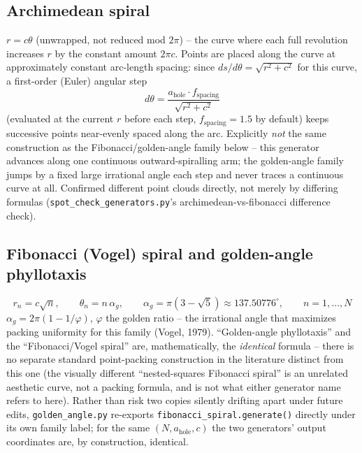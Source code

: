 \subsection{Archimedean spiral}
$r=c\theta$ (unwrapped, not reduced mod $2\pi$) -- the curve where each full
revolution increases $r$ by the constant amount $2\pi c$. Points are placed along the
curve at approximately constant arc-length spacing: since $ds/d\theta=\sqrt{r^2+c^2}$
for this curve, a first-order (Euler) angular step
\begin{equation}
d\theta = \frac{a_{\mathrm{hole}}\cdot f_{\mathrm{spacing}}}{\sqrt{r^2+c^2}}
\end{equation}
(evaluated at the current $r$ before each step, $f_{\mathrm{spacing}}=1.5$ by default)
keeps successive points near-evenly spaced along the arc. Explicitly \emph{not} the
same construction as the Fibonacci/golden-angle family below -- this generator advances
along one continuous outward-spiralling arm; the golden-angle family jumps by a fixed
large irrational angle each step and never traces a continuous curve at all. Confirmed
different point clouds directly, not merely by differing formulas
(\texttt{spot\_check\_generators.py}'s archimedean-vs-fibonacci difference check).

\subsection{Fibonacci (Vogel) spiral and golden-angle phyllotaxis}
\begin{equation}
r_n = c\sqrt n, \qquad \theta_n = n\,\alpha_g, \qquad \alpha_g = \pi(3-\sqrt5)\approx137.50776^\circ,
\qquad n=1,\dots,N
\end{equation}
$\alpha_g=2\pi(1-1/\varphi)$, $\varphi$ the golden ratio -- the irrational angle that
maximizes packing uniformity for this family (Vogel, 1979). ``Golden-angle
phyllotaxis'' and the ``Fibonacci/Vogel spiral'' are, mathematically, the
\emph{identical} formula -- there is no separate standard point-packing construction in
the literature distinct from this one (the visually different ``nested-squares
Fibonacci spiral'' is an unrelated aesthetic curve, not a packing formula, and is not
what either generator name refers to here). Rather than risk two copies silently
drifting apart under future edits, \texttt{golden\_angle.py} re-exports
\texttt{fibonacci\_spiral.generate()} directly under its own family label; for the same
$(N,a_{\mathrm{hole}},c)$ the two generators' output coordinates are, by construction,
identical.

